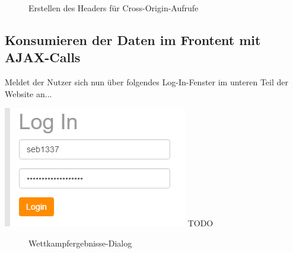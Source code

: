 \begin{figure}[!h]
	\caption{Erstellen des Headers für Cross-Origin-Aufrufe}
	\label{fig:nodeServer2}
\end{figure}

\subsection{Konsumieren der Daten im Frontent mit AJAX-Calls}
\label{Konsumieren der Daten im Frontent mit AJAX-Calls}

Meldet der Nutzer sich nun über folgendes Log-In-Fenster im unteren Teil der Website an...

\includegraphics[scale=0.5]{img/logIn.png}
TODO
\begin{figure}[!h]
	\caption{Wettkampfergebnisse-Dialog}
	\label{fig:wettkampfErgebnisse}
\end{figure}

